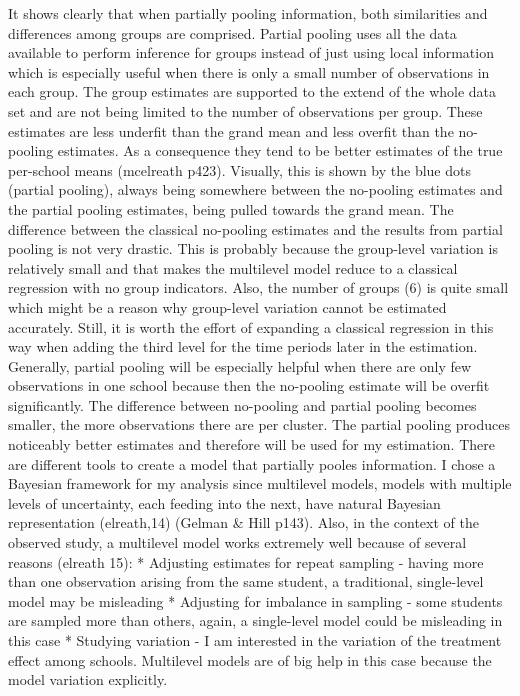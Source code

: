 \documentclass[a4, 12pt]{article}
\begin{document}
It shows clearly that when partially pooling information, both similarities and differences among groups are comprised. Partial pooling uses all the data available to perform inference for groups instead of just using local information which is especially useful when there is only a small number of observations in each group. The group estimates are supported to the extend of the whole data set and are not being limited to the number of observations per group. These estimates are less underfit than the grand mean and less overfit than the no-pooling estimates. As a consequence they tend to be better estimates of the true per-school means (mcelreath p423). Visually, this is shown by the blue dots (partial pooling), always being somewhere between the no-pooling estimates and the partial pooling estimates, being pulled towards the grand mean. The difference between the classical no-pooling estimates and the results from partial pooling is not very drastic. This is probably because the group-level variation is relatively small and that makes the multilevel model reduce to a classical regression with no group indicators. Also, the number of groups (6) is quite small which might be a reason why group-level variation cannot be estimated accurately. Still, it is worth the effort of expanding a classical regression in this way when adding the third level for the time periods later in the estimation. Generally, partial pooling will be especially helpful when there are only few observations in one school because then the no-pooling estimate will be overfit significantly. The difference between no-pooling and partial pooling becomes smaller, the more observations there are per cluster. The partial pooling produces noticeably better estimates and therefore will be used for my estimation. There are different tools to create a model that partially pooles information. I chose a Bayesian framework for my analysis since multilevel models, models with multiple levels of uncertainty, each feeding into the next, have natural Bayesian representation (elreath,14) (Gelman \& Hill p143). Also, in the context of the observed study, a multilevel model works extremely well because of several reasons (elreath 15):
* Adjusting estimates for repeat sampling - having more than one observation arising from the same student, a traditional, single-level model may be misleading
* Adjusting for imbalance in sampling - some students are sampled more than others, again, a single-level model could be misleading in this case
* Studying variation - I am interested in the variation of the treatment effect among schools. Multilevel models are of big help in this case because the model variation explicitly.
\end{document}
